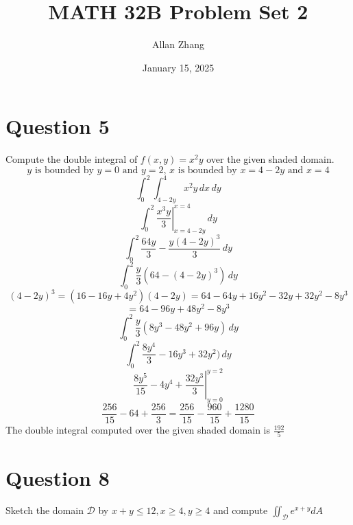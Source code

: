 \documentclass[hidelinks]{article}
\title{\textbf{MATH 32B Problem Set 2}}
\author{Allan Zhang}
\date{January 15, 2025}
\begin{document}
\hypersetup{bookmarksnumbered=true,}
\pagecolor{white}
\color{black}
\maketitle

\section{Question 5}
Compute the double integral of $f(x,y) = x^2y$ over the given shaded domain.
\[
    \text{$y$ is bounded by $y = 0$ and $y = 2$, $x$ is bounded by $x = 4-2y$ and $x = 4$}
\]
\[
    \int_{0}^2 \int_{4 -2y}^{4} x^2y \, dx \, dy
\]
\[
    \int_{0}^2 \left . \frac{x^3y}{3} \right |_{x = 4 -2y}^{x = 4}\, dy
\]
\[
    \int_{0}^2 \frac{64y}{3} - \frac{y(4-2y)^3}{3}\, dy
\]
\[
    \int_{0}^2 \frac{y}{3}(64 - (4-2y)^3) \, dy
\]
\[
    (4-2y)^3 = (16 - 16y + 4y^2)(4 - 2y) = 64 - 64y + 16y^2 - 32y + 32y^2 -8y^3 
\]
\[
    = 64 - 96y + 48y^2 - 8y^3   
\]
\[
    \int_{0}^2 \frac{y}{3}(8y^3 - 48y^2 + 96y) \, dy
\]
\[
    \int_{0}^2 \frac{8y^4}{3} - 16y^3 + 32y^2) \, dy
\]
\[
    \left. \frac{8y^5}{15} - 4y^4 + \frac{32y^3}{3} \right |_{y = 0}^{y = 2}
\]
\[
    \frac{256}{15} - 64 + \frac{256}{3} = \frac{256}{15} - \frac{960}{15} + \frac{1280}{15}
\]
The double integral computed over the given shaded domain is $\frac{192}{5}$


\newpage
\section{Question 8}
Sketch the domain $\mathcal{D}$ by $x+y \leq 12, x \geq 4, y \geq 4$ and compute $\iint_{\mathcal{D}}e^{x+y}dA$
\begin{center}


\end{center}
\end{document}

